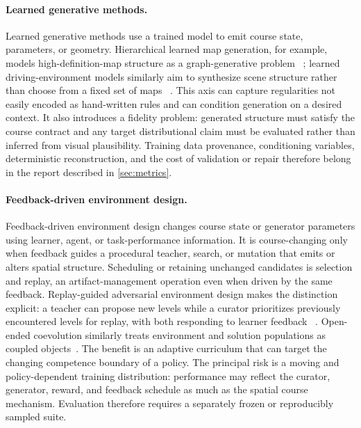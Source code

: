 \paragraph{Learned generative methods.}
Learned generative methods use a trained model to emit course state,
parameters, or geometry.  Hierarchical learned map generation, for example,
models high-definition-map structure as a graph-generative problem
~\cite{Mi2021HDMapGenHierarchical}; learned driving-environment models similarly
aim to synthesize scene structure rather than choose from a fixed set of maps
~\cite{Rowe2025ScenarioDreamer}.  This axis can capture regularities not easily
encoded as hand-written rules and can condition generation on a desired context.
It also introduces a fidelity problem: generated structure must satisfy the
course contract and any target distributional claim must be evaluated rather
than inferred from visual plausibility.  Training data provenance, conditioning
variables, deterministic reconstruction, and the cost of validation or repair
therefore belong in the report described in \cref{sec:metrics}.

\paragraph{Feedback-driven environment design.}
Feedback-driven environment design changes course state or generator parameters
using learner, agent, or task-performance information. It is course-changing only
when feedback guides a procedural teacher, search, or mutation that emits or alters
spatial structure. Scheduling or retaining unchanged candidates is selection and
replay, an artifact-management operation even when driven by the same feedback.
Replay-guided adversarial environment design makes the distinction explicit: a
teacher can propose new levels while a curator prioritizes previously encountered
levels for replay, with both responding to learner feedback
~\cite{Jiang2021ReplayGuided}. Open-ended coevolution similarly treats environment
and solution populations as coupled objects~\cite{Wang2019POETOpen}. The benefit is
an adaptive curriculum that can target the changing competence boundary of a policy.
The principal risk is a moving and policy-dependent training distribution:
performance may reflect the curator, generator, reward, and feedback schedule as
much as the spatial course mechanism. Evaluation therefore requires a separately
frozen or reproducibly sampled suite.

